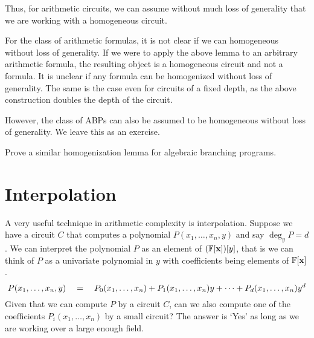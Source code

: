 Thus, for arithmetic circuits, we can assume without much loss of generality that we are working with a homogeneous circuit. 

\begin{remark*}
For the class of arithmetic formulas, it is not clear if we can homogeneous without loss of generality. 
If we were to apply the above lemma to an arbitrary arithmetic formula, the resulting object is a homogeneous circuit and not a formula. 
It is unclear if any formula can be homogenized without loss of generality. 
The same is the case even for circuits of a fixed depth, as the above construction doubles the depth of the circuit. 

However, the class of ABPs can also be assumed to be homogeneous without loss of generality. 
We leave this as an exercise. 
\end{remark*}

\begin{exercise}
Prove a similar homogenization lemma for algebraic branching programs. 
\end{exercise}

\section{Interpolation}

A very useful technique in arithmetic complexity is interpolation. Suppose we have a circuit $C$ that computes a polynomial $P(x_1,\ldots, x_n, y)$ and say $\deg_y P = d$. We can interpret the polynomial $P$ as an element of $(\mathbb{F}[\mathbf{x}])[y]$, that is we can think of $P$ as a univariate polynomial in $y$ with coefficients being elements of $\mathbb{F}[\mathbf{x}]$. 
\[
P(x_1,\ldots, x_n, y) \quad = \quad P_0(x_1,\ldots, x_n) + P_1(x_1,\ldots, x_n) y + \cdots + P_d(x_1,\ldots, x_n) y^d
\]
Given that we can compute $P$ by a circuit $C$, can we also compute one of the coefficients $P_i(x_1,\ldots, x_n)$ by a small circuit? The answer is `Yes' as long as we are working over a large enough field. 

